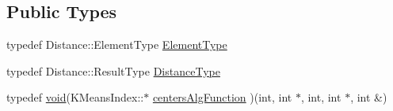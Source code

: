 \subsection*{Public Types}
\begin{DoxyCompactItemize}
\item 
typedef Distance\-::\-Element\-Type \hyperlink{classcvflann_1_1KMeansIndex_a2a28d6535e3e452320f97417f6c127ef}{Element\-Type}
\item 
typedef Distance\-::\-Result\-Type \hyperlink{classcvflann_1_1KMeansIndex_adcf3e940c1ab76474f113c4db65d36c5}{Distance\-Type}
\item 
typedef \hyperlink{legacy_8hpp_a8bb47f092d473522721002c86c13b94e}{void}(K\-Means\-Index\-::$\ast$ \hyperlink{classcvflann_1_1KMeansIndex_a09b9ff9e5a1686adc4a5e6cc8a765768}{centers\-Alg\-Function} )(int, int $\ast$, int, int $\ast$, int \&)
\end{DoxyCompactItemize}
